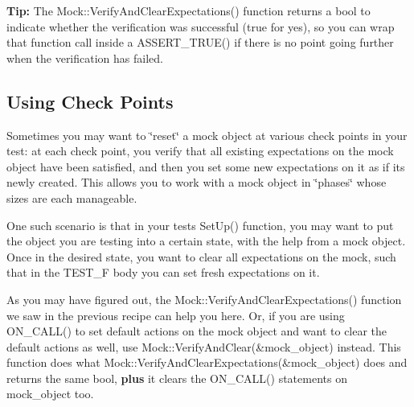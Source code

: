 \begin{DoxyCode}{0}
\DoxyCodeLine{}
\DoxyCodeLine{}
\DoxyCodeLine{}
\end{DoxyCode}


{\bfseries Tip\+:} The {\ttfamily Mock\+::\+Verify\+And\+Clear\+Expectations()} function returns a {\ttfamily bool} to indicate whether the verification was successful ({\ttfamily true} for yes), so you can wrap that function call inside a {\ttfamily A\+S\+S\+E\+R\+T\+\_\+\+T\+R\+U\+E()} if there is no point going further when the verification has failed.

\subsection*{Using Check Points}

Sometimes you may want to \char`\"{}reset\char`\"{} a mock object at various check points in your test\+: at each check point, you verify that all existing expectations on the mock object have been satisfied, and then you set some new expectations on it as if it\textquotesingle{}s newly created. This allows you to work with a mock object in \char`\"{}phases\char`\"{} whose sizes are each manageable.

One such scenario is that in your test\textquotesingle{}s {\ttfamily Set\+Up()} function, you may want to put the object you are testing into a certain state, with the help from a mock object. Once in the desired state, you want to clear all expectations on the mock, such that in the {\ttfamily T\+E\+S\+T\+\_\+F} body you can set fresh expectations on it.

As you may have figured out, the {\ttfamily Mock\+::\+Verify\+And\+Clear\+Expectations()} function we saw in the previous recipe can help you here. Or, if you are using {\ttfamily O\+N\+\_\+\+C\+A\+L\+L()} to set default actions on the mock object and want to clear the default actions as well, use {\ttfamily Mock\+::\+Verify\+And\+Clear(\&mock\+\_\+object)} instead. This function does what {\ttfamily Mock\+::\+Verify\+And\+Clear\+Expectations(\&mock\+\_\+object)} does and returns the same {\ttfamily bool}, {\bfseries plus} it clears the {\ttfamily O\+N\+\_\+\+C\+A\+L\+L()} statements on {\ttfamily mock\+\_\+object} too.

